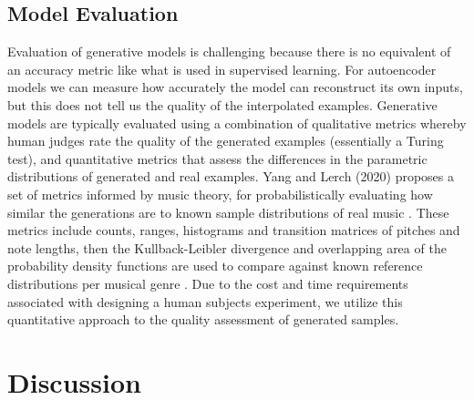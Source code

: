 \documentclass[sigconf,authorversion]{acmart}
\begin{document}
\subsection{Model Evaluation}

Evaluation of generative models is challenging because there is no
equivalent of an accuracy metric like what is used in supervised
learning. For autoencoder models we can measure how accurately the
model can reconstruct its own inputs, but this does not tell us the
quality of the interpolated examples. Generative models are typically
evaluated using a combination of qualitative metrics whereby human
judges rate the quality of the generated examples (essentially a
Turing test), and quantitative metrics that assess the differences in
the parametric distributions of generated and real examples. Yang and
Lerch (2020) proposes a set of metrics informed by music theory, for
probabilistically evaluating how similar the generations are to known
sample distributions of real music \cite{yang_evaluation_2020}. These
metrics include counts, ranges, histograms and transition matrices of
pitches and note lengths, then the Kullback-Leibler divergence and
overlapping area of the probability density functions are used to
compare against known reference distributions per musical genre
\cite{yang_evaluation_2020}. Due to the cost and time requirements
associated with designing a human subjects experiment, we
utilize this quantitative approach to the quality assessment of
generated samples.

\section{Discussion}



\end{document}
